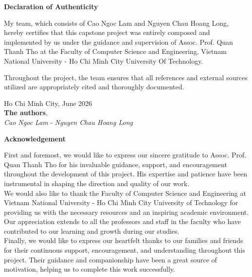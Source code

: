 \onehalfspacing
\noindent\textbf{\Huge Declaration of Authenticity}
\vspace{0.5cm}

\noindent My team, which consists of Cao Ngoc Lam and Nguyen Chau Hoang Long, hereby certifies that this capstone project was entirely composed and implemented by us under the guidance and supervision of Assoc. Prof. Quan Thanh Tho at the Faculty of Computer Science and Engineering, Vietnam National University - Ho Chi Minh City University Of Technology.
\vspace{0.5cm}

\noindent Throughout the project, the team ensures that all references and external sources utilized are appropriately cited and thoroughly documented.
\vspace{2cm}

\begin{flushright}
Ho Chi Minh City, June 2026\\
\textbf{The authors},\\
\textit{Cao Ngoc Lam} - \textit{Nguyen Chau Hoang Long}\\
\end{flushright}

\newpage 

\noindent\textbf{\Huge Acknowledgement}
\vspace{1cm}

\noindent First and foremost, we would like to express our sincere gratitude to Assoc. Prof. Quan Thanh Tho for his invaluable guidance, support, and encouragement throughout the development of this project. His expertise and patience have been instrumental in shaping the direction and quality of our work.\\

\noindent We would also like to thank the Faculty of Computer Science and Engineering at Vietnam National University - Ho Chi Minh City University of Technology for providing us with the necessary resources and an inspiring academic environment. Our appreciation extends to all the professors and staff in the faculty who have contributed to our learning and growth during our studies.\\

\noindent Finally, we would like to express our heartfelt thanks to our families and friends for their continuous support, encouragement, and understanding throughout this project. Their guidance and companionship have been a great source of motivation, helping us to complete this work successfully.

